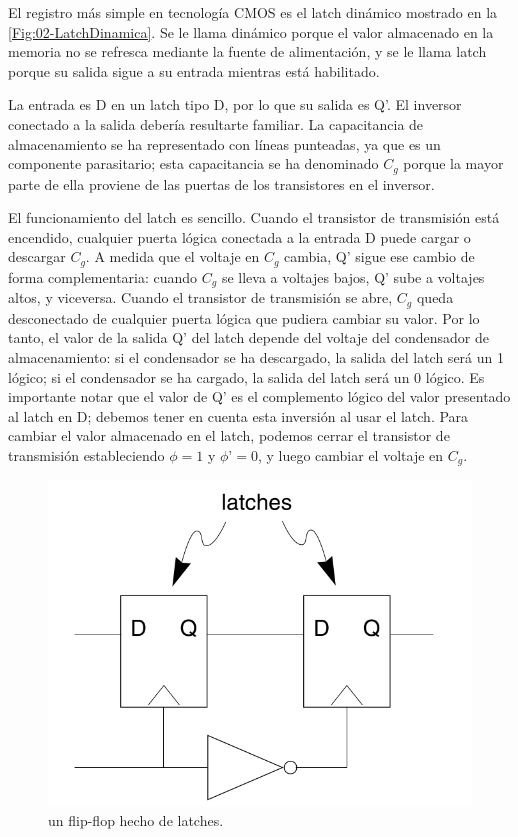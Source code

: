 El registro más simple en tecnología CMOS es el latch dinámico mostrado en la \cref{Fig:02-LatchDinamica}. Se le llama dinámico porque el valor almacenado en la memoria no se refresca mediante la fuente de alimentación, y se le llama latch porque su salida sigue a su entrada mientras está habilitado.



La entrada es D en un latch tipo D, por lo que su salida es Q’. El inversor conectado a la salida debería resultarte familiar. La capacitancia de almacenamiento se ha representado con líneas punteadas, ya que es un componente parasitario; esta capacitancia se ha denominado $C_g$ porque la mayor parte de ella proviene de las puertas de los transistores en el inversor.

El funcionamiento del latch es sencillo. Cuando el transistor de transmisión está encendido, cualquier puerta lógica conectada a la entrada D puede cargar o descargar $C_g$. A medida que el voltaje en $C_g$ cambia, Q’ sigue ese cambio de forma complementaria: cuando $C_g$ se lleva a voltajes bajos, Q’ sube a voltajes altos, y viceversa. Cuando el transistor de transmisión se abre, $C_g$ queda desconectado de cualquier puerta lógica que pudiera cambiar su valor. Por lo tanto, el valor de la salida Q’ del latch depende del voltaje del condensador de almacenamiento: si el condensador se ha descargado, la salida del latch será un 1 lógico; si el condensador se ha cargado, la salida del latch será un 0 lógico. Es importante notar que el valor de Q’ es el complemento lógico del valor presentado al latch en D; debemos tener en cuenta esta inversión al usar el latch. Para cambiar el valor almacenado en el latch, podemos cerrar el transistor de transmisión estableciendo $\phi = 1$ y $\phi’ = 0$, y luego cambiar el voltaje en $C_g$.

\begin{figure}[H] \centering
    \includegraphics[width=0.6\linewidth]{Imagenes/02/02-FlipFlop.png}
    \caption{un flip-flop hecho de latches.}
    \label{Fig:02-FlipFlop}
\end{figure}

